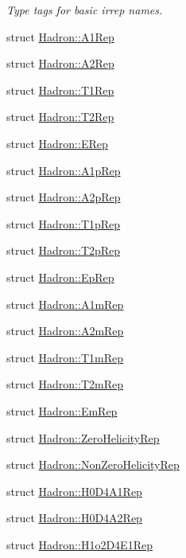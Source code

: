 \begin{DoxyCompactItemize}
\begin{DoxyCompactList}\small\item\em Type tags for basic irrep names. \end{DoxyCompactList}\item 
struct \mbox{\hyperlink{structHadron_1_1A1Rep}{Hadron\+::\+A1\+Rep}}
\item 
struct \mbox{\hyperlink{structHadron_1_1A2Rep}{Hadron\+::\+A2\+Rep}}
\item 
struct \mbox{\hyperlink{structHadron_1_1T1Rep}{Hadron\+::\+T1\+Rep}}
\item 
struct \mbox{\hyperlink{structHadron_1_1T2Rep}{Hadron\+::\+T2\+Rep}}
\item 
struct \mbox{\hyperlink{structHadron_1_1ERep}{Hadron\+::\+E\+Rep}}
\item 
struct \mbox{\hyperlink{structHadron_1_1A1pRep}{Hadron\+::\+A1p\+Rep}}
\item 
struct \mbox{\hyperlink{structHadron_1_1A2pRep}{Hadron\+::\+A2p\+Rep}}
\item 
struct \mbox{\hyperlink{structHadron_1_1T1pRep}{Hadron\+::\+T1p\+Rep}}
\item 
struct \mbox{\hyperlink{structHadron_1_1T2pRep}{Hadron\+::\+T2p\+Rep}}
\item 
struct \mbox{\hyperlink{structHadron_1_1EpRep}{Hadron\+::\+Ep\+Rep}}
\item 
struct \mbox{\hyperlink{structHadron_1_1A1mRep}{Hadron\+::\+A1m\+Rep}}
\item 
struct \mbox{\hyperlink{structHadron_1_1A2mRep}{Hadron\+::\+A2m\+Rep}}
\item 
struct \mbox{\hyperlink{structHadron_1_1T1mRep}{Hadron\+::\+T1m\+Rep}}
\item 
struct \mbox{\hyperlink{structHadron_1_1T2mRep}{Hadron\+::\+T2m\+Rep}}
\item 
struct \mbox{\hyperlink{structHadron_1_1EmRep}{Hadron\+::\+Em\+Rep}}
\item 
struct \mbox{\hyperlink{structHadron_1_1ZeroHelicityRep}{Hadron\+::\+Zero\+Helicity\+Rep}}
\item 
struct \mbox{\hyperlink{structHadron_1_1NonZeroHelicityRep}{Hadron\+::\+Non\+Zero\+Helicity\+Rep}}
\item 
struct \mbox{\hyperlink{structHadron_1_1H0D4A1Rep}{Hadron\+::\+H0\+D4\+A1\+Rep}}
\item 
struct \mbox{\hyperlink{structHadron_1_1H0D4A2Rep}{Hadron\+::\+H0\+D4\+A2\+Rep}}
\item 
struct \mbox{\hyperlink{structHadron_1_1H1o2D4E1Rep}{Hadron\+::\+H1o2\+D4\+E1\+Rep}}

\end{DoxyCompactItemize}
